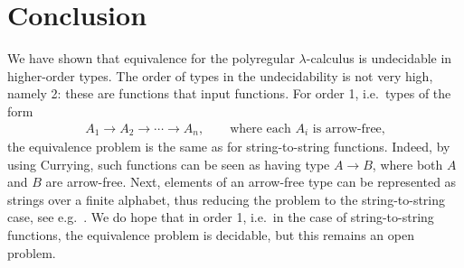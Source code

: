 \documentclass{article}
\begin{document}
\section{Conclusion}
\label{sec:conclusion}
We have shown that equivalence for the polyregular $\lambda$-calculus is undecidable in higher-order types. The order of types in the undecidability is not very high, namely 2: these are functions that input functions. For order 1, i.e.~types of the form 
\begin{align*}
A_1 \to A_2 \to \cdots \to A_n, \qquad \text{where each $A_i$ is arrow-free,}
\end{align*}
the equivalence problem is the same as for string-to-string functions. Indeed, by using Currying, such functions can be seen as having type $A \to B$, where both $A$ and $B$ are arrow-free. Next, elements of an arrow-free type can be represented as strings over a finite alphabet, thus reducing the problem to the string-to-string case, see e.g.~\cite[Lemma 4.4]{bojanczykRegularFirstOrderList2018}.  We do hope that in order 1, i.e.~in the case of string-to-string functions, the equivalence problem is decidable, but this remains an open problem.



\end{document}
